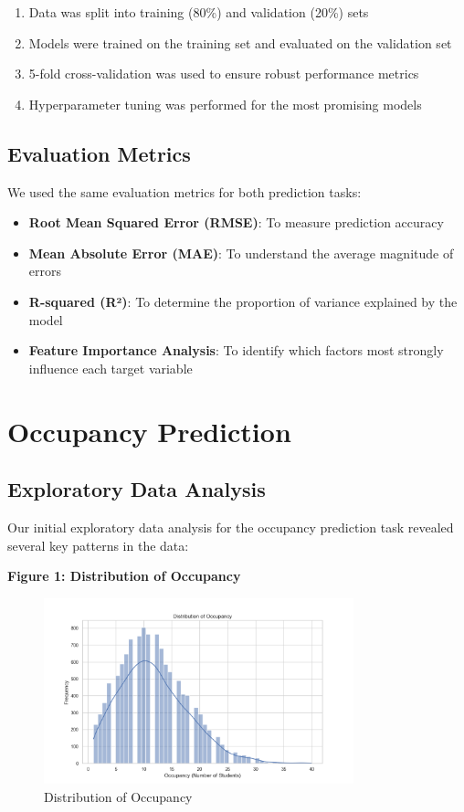 \documentclass[12pt,letterpaper]{article}
\begin{document}
\begin{enumerate}
    \item Data was split into training (80\%) and validation (20\%) sets
    \item Models were trained on the training set and evaluated on the validation set
    \item 5-fold cross-validation was used to ensure robust performance metrics
    \item Hyperparameter tuning was performed for the most promising models
\end{enumerate}

\subsection{Evaluation Metrics}

We used the same evaluation metrics for both prediction tasks:

\begin{itemize}
    \item \textbf{Root Mean Squared Error (RMSE)}: To measure prediction accuracy
    \item \textbf{Mean Absolute Error (MAE)}: To understand the average magnitude of errors
    \item \textbf{R-squared (R²)}: To determine the proportion of variance explained by the model
    \item \textbf{Feature Importance Analysis}: To identify which factors most strongly influence each target variable
\end{itemize}

\section{Occupancy Prediction}

\subsection{Exploratory Data Analysis}

Our initial exploratory data analysis for the occupancy prediction task revealed several key patterns in the data:

\textbf{Figure 1: Distribution of Occupancy}

\begin{figure}[H]
    \centering
    \includegraphics[width=0.8\textwidth]{occupancy_prediction/visualizations/occupancy_distribution.png}
    \caption{Distribution of Occupancy}
\end{figure}
\end{document}
